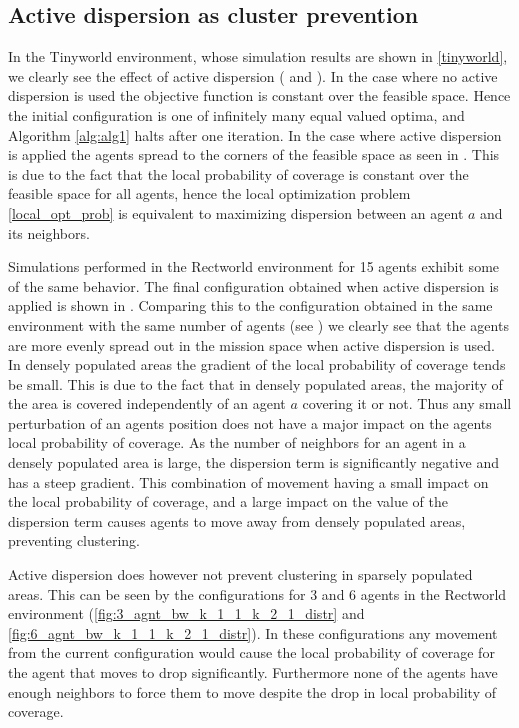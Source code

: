 \subsection{Active dispersion as cluster prevention}
In the Tinyworld environment, whose simulation results are shown in \ref{tinyworld}, we clearly see the effect of active dispersion ( and ). 
In the case where no active dispersion is used the objective function is constant over the feasible space. Hence the initial configuration is one of 
infinitely many equal valued optima, and Algorithm \ref{alg:alg1} halts after one iteration. In the case where active dispersion is applied the agents spread to the corners of the
feasible space as seen in . This is due to the fact that the local probability of coverage is constant over the feasible space for all agents, hence the 
local optimization problem \eqref{local_opt_prob} is equivalent to maximizing dispersion between an agent $a$ and its neighbors. 

Simulations performed in the Rectworld environment for 15 agents exhibit some of the same behavior. The final configuration obtained when active dispersion
is applied is shown in . Comparing this to the configuration obtained in the same environment with the same number of agents (see )
we clearly see that the agents are more evenly spread out in the mission space when active dispersion is used. In densely populated areas the gradient of the local probability of coverage tends be small. This is due to the fact that in densely populated areas, 
the majority of the area is covered independently of an agent $a$ covering it or not. Thus any small perturbation of an agents position does not have a major impact on
the agents local probability of coverage. As the number of neighbors for an agent in a densely populated area is large, the dispersion term is significantly negative and has a steep gradient.
This combination of movement having a small impact on the local probability of coverage, and a large impact on the value of the dispersion term causes agents to move away from densely populated areas, 
preventing clustering.

Active dispersion does however not prevent clustering in sparsely populated areas. This can be seen by the configurations for 3 and 6 agents in the
Rectworld environment (\ref{fig:3_agnt_bw_k_1_1_k_2_1_distr} and \ref{fig:6_agnt_bw_k_1_1_k_2_1_distr}). In these configurations any
movement from the current configuration would cause the local
probability of coverage for the agent that moves to drop significantly. Furthermore none of the agents have enough neighbors to force them to move despite
the drop in local probability of coverage.

